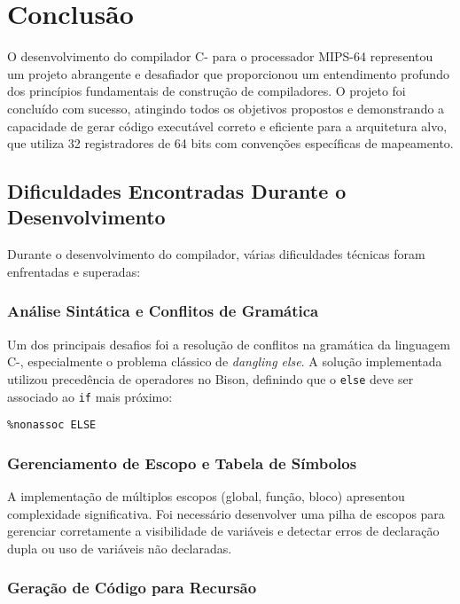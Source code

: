 \documentclass[
	12pt,				%
	oneside,
	a4paper,			%
	english,			%
	french,				%
	spanish,			%
	brazil,				%
	]{abntex2}
\begin{document}
\chapter{Conclusão}

O desenvolvimento do compilador C- para o processador MIPS-64 representou um projeto abrangente e desafiador que proporcionou um entendimento profundo dos princípios fundamentais de construção de compiladores. O projeto foi concluído com sucesso, atingindo todos os objetivos propostos e demonstrando a capacidade de gerar código executável correto e eficiente para a arquitetura alvo, que utiliza 32 registradores de 64 bits com convenções específicas de mapeamento.

\section{Dificuldades Encontradas Durante o Desenvolvimento}

Durante o desenvolvimento do compilador, várias dificuldades técnicas foram enfrentadas e superadas:

\subsection{Análise Sintática e Conflitos de Gramática}

Um dos principais desafios foi a resolução de conflitos na gramática da linguagem C-, especialmente o problema clássico de \textit{dangling else}. A solução implementada utilizou precedência de operadores no Bison, definindo que o \texttt{else} deve ser associado ao \texttt{if} mais próximo:

\begin{lstlisting}[style=cstyle]
%nonassoc LOWER_THAN_ELSE
%nonassoc ELSE
\end{lstlisting}

\subsection{Gerenciamento de Escopo e Tabela de Símbolos}

A implementação de múltiplos escopos (global, função, bloco) apresentou complexidade significativa. Foi necessário desenvolver uma pilha de escopos para gerenciar corretamente a visibilidade de variáveis e detectar erros de declaração dupla ou uso de variáveis não declaradas.

\subsection{Geração de Código para Recursão}
\end{document}
